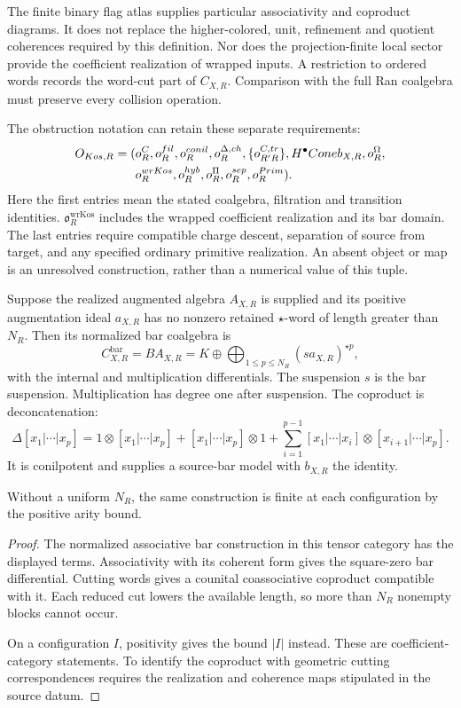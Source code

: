 The finite binary flag atlas supplies particular associativity
and coproduct diagrams. It does not replace the higher-colored,
unit, refinement and quotient coherences required by this
definition. Nor does the projection-finite local sector provide the
coefficient realization of wrapped inputs. A restriction to ordered
words records the word-cut part of $C_{X,R}$. Comparison with the
full Ran coalgebra must preserve every collision operation.

The obstruction notation can retain these separate requirements:
\[
\begin{split}
 O_{Kos,R}=
 (&o^C_R,o^{fil}_R,
 o^{conil}_R,o^{\Delta,ch}_R,
 \{o^{C,tr}_{R'R}\},
 H^\bullet Coneb_{X,R},o^\Omega_R,\\
 &o^{wrKos}_R,o^{hyb}_R,
 o^\Pi_R,o^{sep}_R,
 o^{Prim}_R).
\end{split}
\]
Here the first entries mean the stated coalgebra, filtration and
transition identities. $\mathfrak o^{\mathrm{wrKos}}_R$ includes
the wrapped coefficient realization and its bar domain.
The last entries require compatible charge descent, separation of
source from target, and any specified ordinary primitive realization.
An absent object or map is an unresolved construction, rather than
a numerical value of this tuple.

\begin{proposition}
\label{prop:canonical-source-bar-coalgebra}
Suppose the realized augmented algebra $A_{X,R}$ is supplied and
its positive augmentation ideal $a_{X,R}$ has no nonzero retained
$\star$-word of length greater than $N_R$. Then its normalized
bar coalgebra is
\[
 C^{\mathrm{bar}}_{X,R}=BA_{X,R}
 =K\oplus\bigoplus_{1\leq p\leq N_R}(sa_{X,R})^{\star p},
\]
with the internal and multiplication differentials. The suspension
$s$ is the bar suspension. Multiplication has degree one after
suspension. The coproduct is deconcatenation:
\[
 \Delta[x_1|\cdots|x_p]
 =1\otimes[x_1|\cdots|x_p]+[x_1|\cdots|x_p]\otimes1
  +\sum_{i=1}^{p-1}[x_1|\cdots|x_i]\otimes[x_{i+1}|\cdots|x_p].
\]
It is conilpotent and supplies a source-bar model with $b_{X,R}$
the identity.

Without a uniform $N_R$, the same construction is
finite at each configuration by the positive arity bound.
\end{proposition}
\begin{proof}
The normalized associative bar construction in this tensor category
has the displayed terms. Associativity with its coherent form gives
the square-zero bar differential. Cutting words gives a counital
coassociative coproduct compatible with it. Each reduced cut lowers
the available length, so more than $N_R$ nonempty blocks cannot
occur.

On a configuration $I$, positivity gives the bound $|I|$
instead. These are coefficient-category statements. To identify
the coproduct with geometric cutting correspondences requires the
realization and coherence maps stipulated in the source datum.
\end{proof}


